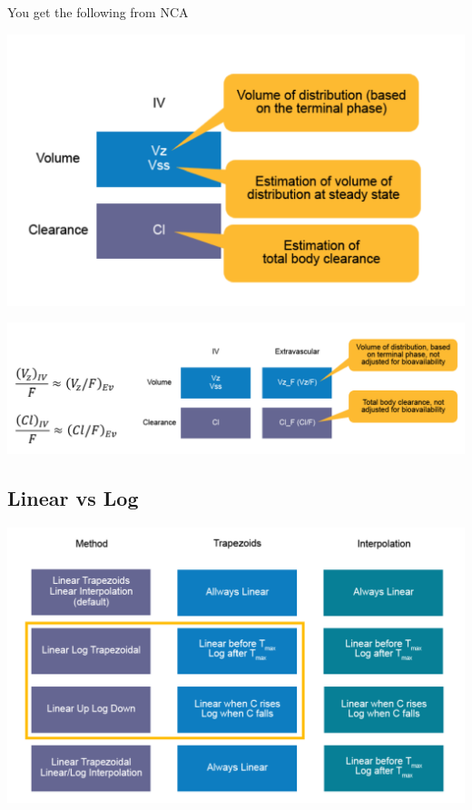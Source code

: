\documentclass[
  letterpaper,
  DIV=11,
  numbers=noendperiod]{scrreprt}
\begin{document}
You get the following from NCA

\includegraphics{./images/image-438969836.png}

\includegraphics{./images/image-1032710582.png}

\hypertarget{linear-vs-log}{%
\subsection{Linear vs Log}\label{linear-vs-log}}

\includegraphics{./images/image-1313806547.png}

\end{document}
